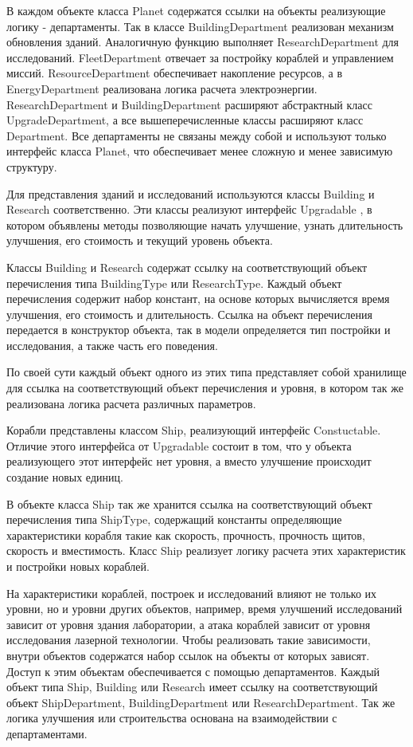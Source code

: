 В каждом объекте класса Planet содержатся ссылки на объекты реализующие логику - департаменты. Так в классе BuildingDepartment реализован механизм обновления зданий. Аналогичную функцию выполняет ResearchDepartment для исследований. FleetDepartment отвечает за постройку кораблей и управлением миссий. ResourceDepartment обеспечивает накопление ресурсов, а в EnergyDepartment  реализована логика расчета электроэнергии. ResearchDepartment и BuildingDepartment расширяют абстрактный класс UpgradeDepartment, а все вышеперечисленные классы расширяют класс Department. Все департаменты не связаны между собой и используют только интерфейс класса Planet, что обеспечивает менее сложную и менее зависимую структуру.

Для представления зданий и исследований используются классы Building  и Research  соответственно. Эти классы реализуют интерфейс Upgradable , в котором объявлены методы позволяющие начать улучшение, узнать длительность улучшения, его стоимость и текущий уровень объекта.

Классы Building и Research содержат ссылку на соответствующий объект перечисления типа BuildingType   или
 ResearchType. Каждый объект перечисления содержит набор констант, на основе которых вычисляется время улучшения, его стоимость и длительность. Ссылка на объект перечисления передается в конструктор объекта, так в модели определяется тип постройки и исследования, а также часть его поведения.

По своей сути каждый объект одного из этих типа представляет собой хранилище для ссылка на соответствующий объект перечисления и уровня, в котором так же реализована логика расчета различных параметров. 

Корабли представлены классом Ship, реализующий интерфейс Constuctable. Отличие этого интерфейса от Upgradable состоит в том, что у объекта реализующего этот интерфейс нет уровня, а вместо улучшение происходит создание новых единиц.

В объекте класса Ship так же хранится ссылка на соответствующий объект перечисления типа ShipType, содержащий константы определяющие характеристики корабля такие как скорость, прочность, прочность щитов, скорость и вместимость. Класс Ship реализует логику расчета этих характеристик и постройки новых кораблей.

На характеристики кораблей, построек и исследований влияют не только их уровни, но и уровни других объектов, например, время улучшений исследований зависит от уровня здания лаборатории, а атака кораблей зависит от уровня исследования лазерной технологии. Чтобы реализовать такие зависимости, внутри объектов содержатся набор ссылок на объекты от которых зависят. Доступ к этим объектам обеспечивается с помощью департаментов. Каждый объект типа Ship, Building или Research имеет ссылку на соответствующий объект ShipDepartment, BuildingDepartment или ResearchDepartment. Так же логика улучшения или строительства основана на взаимодействии с департаментами.

